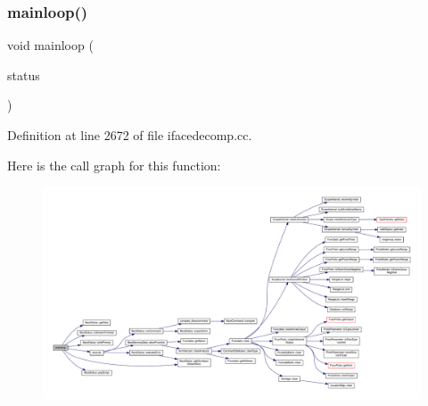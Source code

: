 \subsubsection{\texorpdfstring{mainloop()}{mainloop()}}
{\footnotesize\ttfamily void mainloop (\begin{DoxyParamCaption}\item[{\mbox{\hyperlink{class_iface_status}{Iface\+Status}} $\ast$}]{status }\end{DoxyParamCaption})}



Definition at line 2672 of file ifacedecomp.\+cc.

Here is the call graph for this function\+:
\nopagebreak
\begin{figure}[H]
\begin{center}
\leavevmode
\includegraphics[width=350pt]{ifacedecomp_8hh_ac71bcb680ffca9a7d79b5ba44be1f612_cgraph}
\end{center}
\end{figure}
